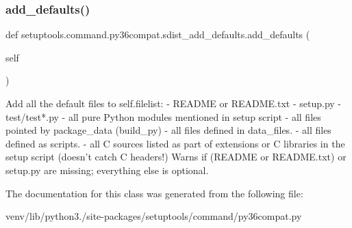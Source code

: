 \subsubsection{\texorpdfstring{add\+\_\+defaults()}{add\_defaults()}}
{\footnotesize\ttfamily def setuptools.\+command.\+py36compat.\+sdist\+\_\+add\+\_\+defaults.\+add\+\_\+defaults (\begin{DoxyParamCaption}\item[{}]{self }\end{DoxyParamCaption})}

\begin{DoxyVerb}Add all the default files to self.filelist:
  - README or README.txt
  - setup.py
  - test/test*.py
  - all pure Python modules mentioned in setup script
  - all files pointed by package_data (build_py)
  - all files defined in data_files.
  - all files defined as scripts.
  - all C sources listed as part of extensions or C libraries
    in the setup script (doesn't catch C headers!)
Warns if (README or README.txt) or setup.py are missing; everything
else is optional.
\end{DoxyVerb}
 

The documentation for this class was generated from the following file\+:\begin{DoxyCompactItemize}
\item 
venv/lib/python3./site-\/packages/setuptools/command/py36compat.\+py\end{DoxyCompactItemize}

